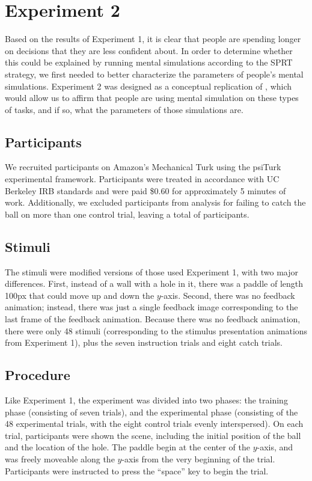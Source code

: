 \documentclass[10pt,letterpaper]{article}
\begin{document}
\section{Experiment 2}

Based on the results of Experiment 1, it is clear that people are spending longer on decisions that they are less confident about. In order to determine whether this could be explained by running mental simulations according to the SPRT strategy, we first needed to better characterize the parameters of people's mental simulations. Experiment 2 was designed as a conceptual replication of , which would allow us to affirm that people are using mental simulation on these types of tasks, and if so, what the parameters of those simulations are.

\subsection{Participants}

We recruited \PaddleNumComplete{} participants on Amazon's Mechanical Turk using the psiTurk \cite{McDonnell12} experimental framework. Participants were treated in accordance with UC Berkeley IRB standards and were paid \$0.60 for approximately 5 minutes of work. Additionally, we excluded \PaddleNumFailed{} participants from analysis for failing to catch the ball on more than one control trial, leaving a total of \PaddleNumOk{} participants.

\subsection{Stimuli}

The stimuli were modified versions of those used Experiment 1, with two major differences. First, instead of a wall with a hole in it, there was a paddle of length 100px that could move up and down the $y$-axis. Second, there was no feedback animation; instead, there was just a single feedback image corresponding to the last frame of the feedback animation. Because there was no feedback animation, there were only 48 stimuli (corresponding to the stimulus presentation animations from Experiment 1), plus the seven instruction trials and eight catch trials.

\subsection{Procedure}

Like Experiment 1, the experiment was divided into two phases: the training phase (consisting of seven trials), and the experimental phase (consisting of the 48 experimental trials, with the eight control trials evenly interspersed). On each trial, participants were shown the scene, including the initial position of the ball and the location of the hole. The paddle begin at the center of the $y$-axis, and was freely moveable along the $y$-axis from the very beginning of the trial. Participants were instructed to press the ``space'' key to begin the trial. 
\end{document}

